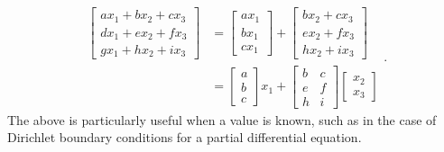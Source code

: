 \documentclass[ltr]{ornltm} %
\numberwithin{equation}{section}
\begin{document}
	\begin{equation}
		\label{eq:matrix-expansion}
		\begin{split}
			\begin{bmatrix}
				ax_1+bx_2+cx_3 \\
				dx_1+ex_2+fx_3 \\
				gx_1+hx_2+ix_3
			\end{bmatrix}
			&=
			\begin{bmatrix}
				ax_1 \\
				bx_1 \\
				cx_1
			\end{bmatrix}+\begin{bmatrix}
							  bx_2+cx_3 \\
							  ex_2+fx_3 \\
							  hx_2+ix_3
			\end{bmatrix}\\
			&=
			\begin{bmatrix}
				a \\
				b \\
				c
			\end{bmatrix}x_1 +
			\begin{bmatrix}
				b & c \\
				e & f \\
				h & i
			\end{bmatrix}\begin{bmatrix}
							 x_2 \\
							 x_3
			\end{bmatrix}
		\end{split}.
	\end{equation}
	The above is particularly useful when a value is known, such as in the case of Dirichlet boundary conditions for a partial differential equation.


	\backmatter

\end{document}
